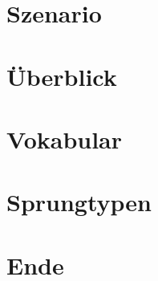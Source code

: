 \documentclass[hyperref={pdfpagelabels=false},usepdftitle=false]{beamer}
\begin{document}
\title{\titleText}
\subtitle{}
\author{\tutor}
\date{28. Februar 2014}
\subject{Proseminar Informatik}

\frame{\titlepage}


\section{Szenario}


\section{Überblick}


\section{Vokabular}


\section{Sprungtypen}


\section{Ende}

\end{document}
